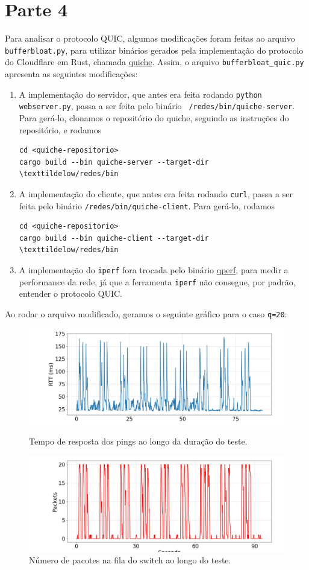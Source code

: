 \documentclass[a4paper,12pt]{article}
\newcommand{\code}[1]{\texttt{#1}}
\begin{document}
\section{Parte 4}

Para analisar o protocolo QUIC, algumas modificações foram feitas ao arquivo \code{bufferbloat.py}, para utilizar binários gerados pela implementação do protocolo do Cloudflare em Rust, chamada \href{https://github.com/cloudflare/quiche}{quiche}. Assim, o arquivo \code{bufferbloat\_quic.py} apresenta as seguintes modificações:
\begin{enumerate}
\item A implementação do servidor, que antes era feita rodando \code{python webserver.py}, passa a ser feita pelo binário \code{~/redes/bin/quiche-server}. Para gerá-lo, clonamos o repositório do quiche, seguindo as instruções do repositório, e rodamos
\begin{verbatim}
cd <quiche-repositorio>
cargo build --bin quiche-server --target-dir \texttildelow/redes/bin
\end{verbatim}
\item A implementação do cliente, que antes era feita rodando \code{curl}, passa a ser feita pelo binário \code{\texttildelow/redes/bin/quiche-client}. Para gerá-lo, rodamos 
  \begin{verbatim}
cd <quiche-repositorio>
cargo build --bin quiche-client --target-dir \texttildelow/redes/bin
\end{verbatim}
\item A implementação do \code{iperf} fora trocada pelo binário \href{https://github.com/rbruenig/qperf}{qperf}, para medir a performance da rede, já que a ferramenta \code{iperf} não consegue, por padrão, entender o protocolo QUIC.
\end{enumerate}

Ao rodar o arquivo modificado, geramos o seguinte gráfico para o caso \code{q=20}:

\begin{figure}[ht!]
  \centering
  \includegraphics[width=0.5\columnwidth]{./bufferbloat/bb-q20/quic-rtt.jpg}
  \caption{Tempo de resposta dos pings ao longo da duração do teste.}
  \includegraphics[width=0.5\columnwidth]{./bufferbloat/bb-q20/quic-buffer.jpg}
  \caption{Número de pacotes na fila do switch ao longo do teste.}
\end{figure}
\end{document}
